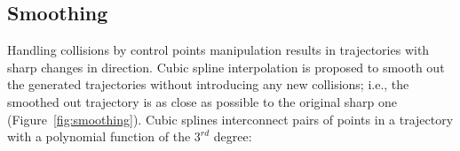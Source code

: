 % 
% 
% 
% 
% 














\subsection{Smoothing}
\label{sec:method:smoothing}

Handling collisions by control points manipulation results in trajectories with sharp changes in direction.
Cubic spline interpolation is proposed to smooth out the generated trajectories without introducing any new collisions; i.e., the smoothed out trajectory is as close as possible to the original sharp one (Figure~\ref{fig:smoothing}).
Cubic splines interconnect pairs of points in a trajectory with a polynomial function of the $3^{rd}$ degree:

